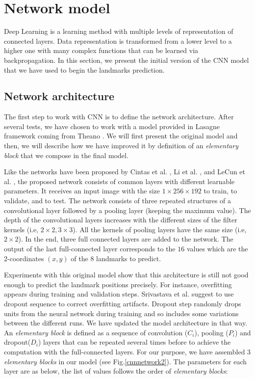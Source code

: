 \documentclass[10pt]{article}
\begin{document}
\section{Network model}
Deep Learning is a learning method with multiple levels of
representation of connected layers. 
Data representation is transformed from a lower level to a
higher one with many complex functions that can be learned via
backpropagation. 
In this section, we present the initial version of the CNN model that we have used
to begin the landmarks prediction. 

\subsection{Network architecture}
\label{secmodel}
The first step to work with CNN is to define the network
architecture. After several tests, we have chosen to work with a model provided in Lasagne framework \cite{lasagne} coming from
Theano \cite{2016arXiv160502688short}. We will first present the
original model and then, we will describe how we have improved it by definition of an
\textit{elementary block} that we compose in the final model.

Like the networks have been proposed by Cintas et al. \cite{cintas2016automatic}, Li et al. \cite{li2015convolutional}, and  LeCun et al. \cite{lecun2010convolutional}, the proposed network consists of common layers
with different learnable parameters. It receives an input image with
the size  $1 \times 256 \times 192$ to train, to validate, and to
test. The network consists of three repeated structures of a convolutional layer
followed by a pooling layer (keeping the maximum value). The depth of the convolutional layers increases with the different sizes of the filter kernels (i.e, $2 \times 2, 3 \times 3$). All the kernels of pooling layers have the same size (i.e, $2 \times 2$). In the end, three full connected layers are added to the
network. The output of the last full-connected
layer corresponds to the $16$ values which are the 2-coordinates $(x,y)$ of the
$8$ landmarks to predict.


Experiments with this original model show that this architecture is still
not good enough to predict the landmark positions precisely. For
instance, overfitting appears during training and validation
steps. Srivastava et al. \cite{srivastava2014dropout} suggest to use
dropout sequence to correct overfitting artifacts. Dropout step randomly drops units from the
neural network during training and so includes some variations between
the different runs. We have updated the model architecture in that
way. An \textit{elementary block} is defined as a sequence of
convolution (\textit{$C_i$}), pooling (\textit{$P_i$}) and dropout(\textit{$D_i$}) layers that can be repeated several
times before to achieve the computation with the full-connected
layers. For our purpose, we have assembled $3$ \textit{elementary
  blocks} in our model (see Fig.\ref{cnnnetwork2}). The parameters for
each layer are as below, the list of values follows the order of
\textit{elementary blocks}:
\end{document}
